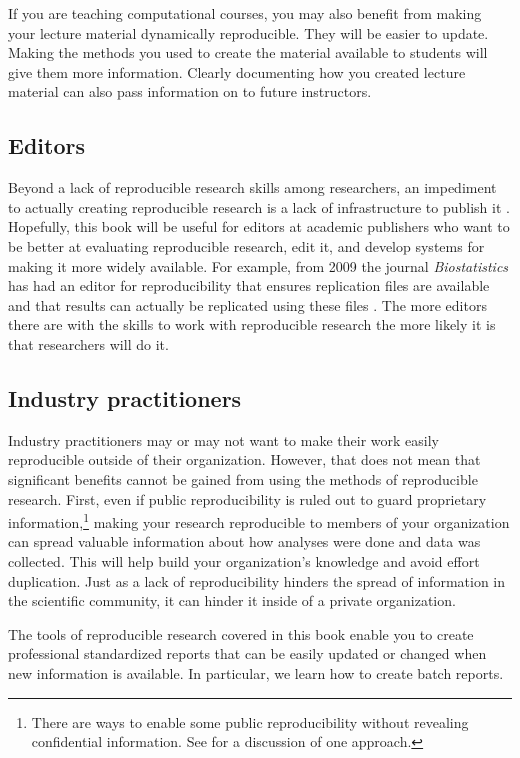 If you are teaching computational courses, you may also benefit from making your lecture material dynamically reproducible. They will be easier to update.  Making the methods you used to create the material available to students will give them more information. Clearly documenting how you created lecture material can also pass information on to future instructors. 

\subsection{Editors}
Beyond a lack of reproducible research skills among researchers, an impediment to actually creating reproducible research is a lack of infrastructure to publish it \cite[]{Peng2011}. Hopefully, this book will be useful for editors at academic publishers who want to be better at evaluating reproducible research, edit it, and develop systems for making it more widely available. For example, from 2009 the journal {\emph{Biostatistics}} has had an editor for reproducibility that ensures replication files are available and that results can actually be replicated using these files \cite[]{Peng2009}. The more editors there are with the skills to work with reproducible research the more likely it is that researchers will do it.

\subsection{Industry practitioners}

Industry practitioners may or may not want to make their work easily reproducible outside of their organization. However, that does not mean that significant benefits cannot be gained from using the methods of reproducible research. First, even if public reproducibility is ruled out to guard proprietary information,\footnote{There are ways to enable some public reproducibility without revealing confidential information. See \cite{Vandewalle2007} for a discussion of one approach.} making your research reproducible to members of your organization can spread valuable information about how analyses were done and data was collected. This will help build your organization's knowledge and avoid effort duplication. Just as a lack of reproducibility hinders the spread of information in the scientific community, it can hinder it inside of a private organization. 

The tools of reproducible research covered in this book enable you to create professional standardized reports that can be easily updated or changed when new information is available. In particular, we learn how to create batch reports.

